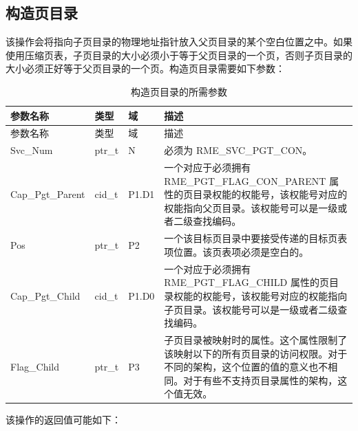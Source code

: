 \subsection{构造页目录}\label{subsec:3-construct-page-directory}

该操作会将指向子页目录的物理地址指针放入父页目录的某个空白位置之中。如果使用压缩页表，子页目录的大小必须小于等于父页目录的一个页，否则子页目录的大小必须正好等于父页目录的一个页。构造页目录需要如下参数：

\begin{xltabular}{\textwidth}{@{}>{\hsize\raggedright\arraybackslash}X>{\hsize\raggedright\arraybackslash}X>{\hsize\raggedright\arraybackslash}X>{\hsize\raggedright\arraybackslash}X@{}}
\caption{构造页目录的所需参数}\label{tab:3-18-construct-page-directory-parameters}\\
\toprule
参数名称 & 类型 & 域 & 描述\tabularnewline
\endfirsthead
\toprule
参数名称 & 类型 & 域 & 描述\tabularnewline
\midrule
\endhead
\bottomrule
\endlastfoot
    Svc\_Num & ptr\_t & N & 必须为 RME\_SVC\_PGT\_CON。\tabularnewline
    Cap\_Pgt\_Parent & cid\_t & P1.D1 & 一个对应于必须拥有 RME\_PGT\_FLAG\_CON\_PARENT 属性的页目录权能的权能号，该权能号对应的权能指向父页目录。该权能号可以是一级或者二级查找编码。\tabularnewline
    Pos & ptr\_t & P2 & 一个该目标页目录中要接受传递的目标页表项位置。该页表项必须是空白的。\tabularnewline
    Cap\_Pgt\_Child & cid\_t & P1.D0 & 一个对应于必须拥有 RME\_PGT\_FLAG\_CHILD 属性的页目录权能的权能号，该权能号对应的权能指向子页目录。该权能号可以是一级或者二级查找编码。\tabularnewline
    Flag\_Child & ptr\_t & P3 & 子页目录被映射时的属性。这个属性限制了该映射以下的所有页目录的访问权限。对于不同的架构，这个位置的值的意义也不相同。对于有些不支持页目录属性的架构，这个值无效。\tabularnewline
\end{xltabular}

该操作的返回值可能如下：


